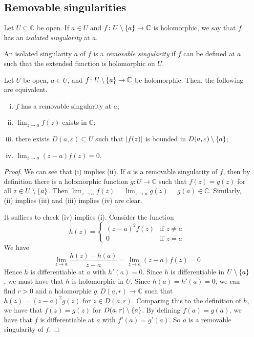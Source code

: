 \subsection{Removable singularities}
\begin{definition}
	Let \( U \subseteq \mathbb C \) be open.
	If \( a \in U \) and \( f \colon U \setminus \qty{a} \to \mathbb C \) is holomorphic, we say that \( f \) has an \textit{isolated singularity} at \( a \).
\end{definition}
\begin{definition}
	An isolated singularity \( a \) of \( f \) is a \textit{removable singularity} if \( f \) can be defined at \( a \) such that the extended function is holomorphic on \( U \).
\end{definition}
\begin{proposition}
	Let \( U \) be open, \( a \in U \), and \( f \colon U \setminus \qty{a} \to \mathbb C \) be holomorphic.
	Then, the following are equivalent.
	\begin{enumerate}[(i)]
		\item \( f \) has a removable singularity at \( a \);
		\item \( \lim_{z \to a} f(z) \) exists in \( \mathbb C \);
		\item there exists \( D(a,\varepsilon) \subseteq U \) such that \( \abs{f(z)} \) is bounded in \( D(a,\varepsilon) \setminus \qty{a} \);
		\item \( \lim_{z \to a} (z-a) f(z) = 0 \).
	\end{enumerate}
\end{proposition}
\begin{proof}
	We can see that (i) implies (ii).
	If \( a \) is a removable singularity of \( f \), then by definition there is a holomorphic function \( g \colon U \to \mathbb C \) such that \( f(z) = g(z) \) for all \( z \in U \setminus \qty{a} \).
	Then \( \lim_{z \to a} f(z) = \lim_{z \to a} g(z) = g(a) \in \mathbb C \).
	Similarly, (ii) implies (iii) and (iii) implies (iv) are clear.

	It suffices to check (iv) implies (i).
	Consider the function
	\[ h(z) = \begin{cases}
		(z-a)^2 f(z) & \text{if } z \neq a \\
		0 & \text{if } z = a
	\end{cases} \]
	We have
	\[ \lim_{z \to a} \frac{h(z) - h(a)}{z-a} = \lim_{z \to a} (z-a) f(z) = 0 \]
	Hence \( h \) is differentiable at \( a \) with \( h'(a) = 0 \).
	Since \( h \) is differentiable in \( U \setminus \qty{a} \), we must have that \( h \) is holomorphic in \( U \).
	Since \( h(a) = h'(a) = 0 \), we can find \( r > 0 \) and a holomorphic \( g \colon D(a,r) \to \mathbb C \) such that \( h(z) = (z-a)^2 g(z) \) for \( z \in D(a,r) \).
	Comparing this to the definition of \( h \), we have that \( f(z) = g(z) \) for \( D(a,r) \setminus \qty{a} \).
	By defining \( f(a) = g(a) \), we have that \( f \) is differentiable at \( a \) with \( f'(a) = g'(a) \).
	So \( a \) is a removable singularity of \( f \).
\end{proof}
